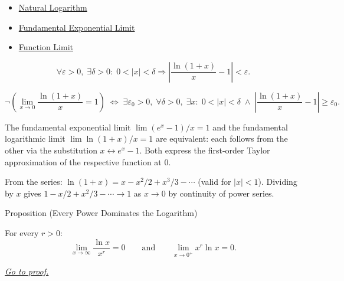 \begin{dependencies}
\begin{itemize}
  \item \hyperref[def:natural-logarithm]{Natural Logarithm}
  \item \hyperref[prop:limit-exponential-fundamental]{Fundamental Exponential Limit}
  \item \hyperref[def:limit-function]{Function Limit}
\end{itemize}
\end{dependencies}

\begin{remark*}
\[
  \forall\varepsilon > 0,\;
  \exists\delta > 0 :\;
  0 < |x| < \delta \Rightarrow
  \left|\frac{\ln(1+x)}{x} - 1\right| < \varepsilon.
\]
\end{remark*}

\begin{remark*}
\[
  \neg\left(\lim_{x\to 0}\frac{\ln(1+x)}{x}=1\right)
  \;\iff\;
  \exists\varepsilon_0>0,\;\forall\delta>0,\;\exists x:\;
  0<|x|<\delta \;\wedge\;
  \left|\frac{\ln(1+x)}{x}-1\right|\geq\varepsilon_0.
\]
\end{remark*}

\begin{remark*}
The fundamental exponential limit $\lim(e^x-1)/x = 1$ and the
fundamental logarithmic limit $\lim\ln(1+x)/x = 1$ are equivalent:
each follows from the other via the substitution $x \leftrightarrow
e^x - 1$. Both express the first-order Taylor approximation of the
respective function at $0$.
\end{remark*}

\begin{remark*}
From the series: $\ln(1+x) = x - x^2/2 + x^3/3 - \cdots$ (valid
for $|x| < 1$). Dividing by $x$ gives $1 - x/2 + x^2/3 - \cdots
\to 1$ as $x \to 0$ by continuity of power series.
\end{remark*}


\begin{propositionbox}{Proposition (Every Power Dominates the Logarithm)}
\begin{proposition}
\label{prop:power-dominates-log}
For every $r > 0$:
\[
  \lim_{x \to \infty} \frac{\ln x}{x^r} = 0
  \qquad\text{and}\qquad
  \lim_{x \to 0^+} x^r \ln x = 0.
\]

\smallskip\noindent
\hyperref[prf:power-dominates-log]{\textit{Go to proof.}}
\end{proposition}
\end{propositionbox}

